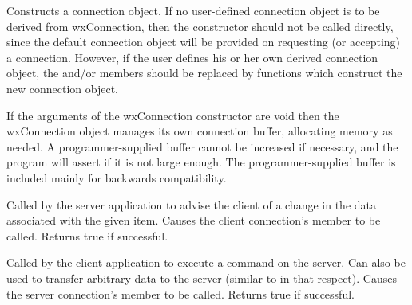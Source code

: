 



Constructs a connection object. If no user-defined connection
object is to be derived from wxConnection, then the constructor
should not be called directly, since the default connection
object will be provided on requesting (or accepting) a
connection. However, if the user defines his or her own derived
connection object, the\rtfsp
and/or  
members should be replaced by functions which construct the new
connection object.

If the arguments of the wxConnection constructor are void then
the wxConnection object manages its own connection buffer,
allocating memory as needed. A programmer-supplied buffer cannot
be increased if necessary, and the program will assert if it is
not large enough. The programmer-supplied buffer is included
mainly for backwards compatibility.

\label{wxddeconnectionadvise}


Called by the server application to advise the client of a change
in the data associated with the given item. Causes the client
connection's  member
to be called. Returns true if successful.

\label{wxddeconnectionexecute}


Called by the client application to execute a command on the
server. Can also be used to transfer arbitrary data to the server
(similar to  in
that respect). Causes the server connection's  
member to be called. Returns true if successful.


